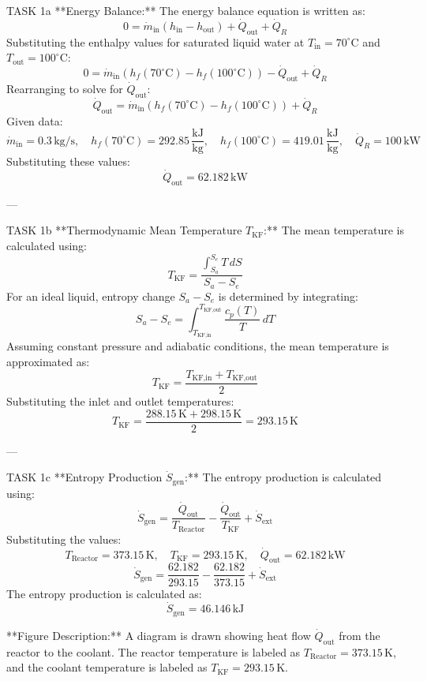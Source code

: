 TASK 1a  
**Energy Balance:**  
The energy balance equation is written as:  
\[
0 = \dot{m}_{\text{in}} \left( h_{\text{in}} - h_{\text{out}} \right) + \dot{Q}_{\text{out}} + \dot{Q}_R
\]  
Substituting the enthalpy values for saturated liquid water at \( T_{\text{in}} = 70^\circ\text{C} \) and \( T_{\text{out}} = 100^\circ\text{C} \):  
\[
0 = \dot{m}_{\text{in}} \left( h_f(70^\circ\text{C}) - h_f(100^\circ\text{C}) \right) - \dot{Q}_{\text{out}} + \dot{Q}_R
\]  
Rearranging to solve for \( \dot{Q}_{\text{out}} \):  
\[
\dot{Q}_{\text{out}} = \dot{m}_{\text{in}} \left( h_f(70^\circ\text{C}) - h_f(100^\circ\text{C}) \right) + \dot{Q}_R
\]  
Given data:  
\[
\dot{m}_{\text{in}} = 0.3 \, \text{kg/s}, \quad h_f(70^\circ\text{C}) = 292.85 \, \frac{\text{kJ}}{\text{kg}}, \quad h_f(100^\circ\text{C}) = 419.01 \, \frac{\text{kJ}}{\text{kg}}, \quad \dot{Q}_R = 100 \, \text{kW}
\]  
Substituting these values:  
\[
\dot{Q}_{\text{out}} = 62.182 \, \text{kW}
\]  

---

TASK 1b  
**Thermodynamic Mean Temperature \( T_{\text{KF}} \):**  
The mean temperature is calculated using:  
\[
T_{\text{KF}} = \frac{\int_{S_a}^{S_e} T \, dS}{S_a - S_e}
\]  
For an ideal liquid, entropy change \( S_a - S_e \) is determined by integrating:  
\[
S_a - S_e = \int_{T_{\text{KF,in}}}^{T_{\text{KF,out}}} \frac{c_p(T)}{T} \, dT
\]  
Assuming constant pressure and adiabatic conditions, the mean temperature is approximated as:  
\[
T_{\text{KF}} = \frac{T_{\text{KF,in}} + T_{\text{KF,out}}}{2}
\]  
Substituting the inlet and outlet temperatures:  
\[
T_{\text{KF}} = \frac{288.15 \, \text{K} + 298.15 \, \text{K}}{2} = 293.15 \, \text{K}
\]  

---

TASK 1c  
**Entropy Production \( \dot{S}_{\text{gen}} \):**  
The entropy production is calculated using:  
\[
\dot{S}_{\text{gen}} = \frac{\dot{Q}_{\text{out}}}{T_{\text{Reactor}}} - \frac{\dot{Q}_{\text{out}}}{T_{\text{KF}}} + \dot{S}_{\text{ext}}
\]  
Substituting the values:  
\[
T_{\text{Reactor}} = 373.15 \, \text{K}, \quad T_{\text{KF}} = 293.15 \, \text{K}, \quad \dot{Q}_{\text{out}} = 62.182 \, \text{kW}
\]  
\[
\dot{S}_{\text{gen}} = \frac{62.182}{293.15} - \frac{62.182}{373.15} + \dot{S}_{\text{ext}}
\]  
The entropy production is calculated as:  
\[
\dot{S}_{\text{gen}} = 46.146 \, \text{kJ}
\]  

**Figure Description:**  
A diagram is drawn showing heat flow \( \dot{Q}_{\text{out}} \) from the reactor to the coolant. The reactor temperature is labeled as \( T_{\text{Reactor}} = 373.15 \, \text{K} \), and the coolant temperature is labeled as \( T_{\text{KF}} = 293.15 \, \text{K} \).